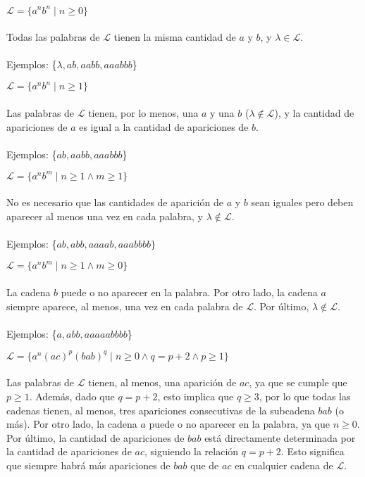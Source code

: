 \documentclass[12pt]{article}
\begin{document}
\begin{enumerate}[label=\roman*.,font=\itshape]
    \item {$\mathcal{L} = \{a^nb^n \mid n\geq 0\}$
    \\
    \\
    {Todas las palabras de $\mathcal{L}$ tienen la misma cantidad de $a$ y $b$, y $\lambda \in \mathcal{L}$.}
    \\
    \\
    Ejemplos: \{$\lambda, ab, aabb, aaabbb$\}
    \item {$\mathcal{L} = \{a^nb^n \mid n\geq 1\}$
    \\
    \\    
    {Las palabras de $\mathcal{L}$ tienen, por lo menos, una $a$ y una $b$ ($\lambda \notin \mathcal{L}$), y la cantidad de apariciones de $a$ es igual a la cantidad de apariciones de $b$.}
    \\
    \\
    Ejemplos: \{$ab, aabb, aaabbb$\}
    \item {$\mathcal{L} = \{a^nb^m \mid n\geq 1 \land m\geq 1\}$
    \\
    \\
    {No es necesario que las cantidades de aparición de $a$ y $b$ sean iguales pero deben aparecer al menos una vez en cada palabra, y $\lambda \notin \mathcal{L}$.}
    \\
    \\
    Ejemplos: \{$ab, abb, aaaab, aaabbbb\}$}
    \item {$\mathcal{L} = \{a^nb^m \mid n\geq 1 \land m\geq 0\}$
    \\
    \\    
    {La cadena $b$ puede o no aparecer en la palabra. Por otro lado, la cadena $a$ siempre aparece, al menos, una vez en cada palabra de $\mathcal{L}$. Por último, $\lambda \notin \mathcal{L}$.}
    \\
    \\
    Ejemplos: \{$a, abb, aaaaabbbb$\}}
    \item {$\mathcal{L} = \{a^n(ac)^p(bab)^q \mid n \geq 0 \land q = p +2 \land p \geq 1\}$
    \\
    \\
    {Las palabras de $\mathcal{L}$ tienen, al menos, una aparición de $ac$, ya que se cumple que $p \geq 1$. Además, dado que $q=p+2$, esto implica que $q\geq3$, por lo que todas las cadenas tienen, al menos, tres apariciones consecutivas de la subcadena $bab$ (o más). Por otro lado, la cadena $a$ puede o no aparecer en la palabra, ya que $n \geq 0$. Por último, la cantidad de apariciones de $bab$ está directamente determinada por la cantidad de apariciones de $ac$, siguiendo la relación $q = p+2$. Esto significa que siempre habrá más apariciones de $bab$ que de $ac$ en cualquier cadena de $\mathcal{L}$.}
}}}
\end{enumerate}
\end{document}
